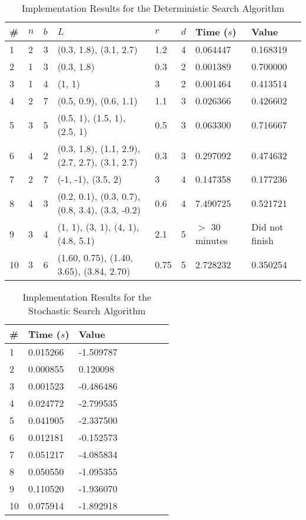 \documentclass[../main.tex]{subfiles}
\begin{document}
\begin{table*}
\caption{Implementation Results for the Deterministic Search Algorithm}
\centering
\label{tab:det-results}
\begin{tabular}{|l|l|l|l|l|l|l|l|}
\hline
\# & $n$ & $b$ & $L$                                             & $r$  & $d$ & Time ($s$)     & Value          \\
\hline
1  & 2   & 3   & (0.3, 1.8), (3.1, 2.7)                          & 1.2  & 4   & 0.064447       & 0.168319       \\
2  & 1   & 3   & (0.3, 1.8)                                      & 0.3  & 2   & 0.001389       & 0.700000       \\
3  & 1   & 4   & (1, 1)                                          & 3    & 2   & 0.001464       & 0.413514       \\
4  & 2   & 7   & (0.5, 0.9), (0.6, 1.1)                          & 1.1  & 3   & 0.026366       & 0.426602       \\
5  & 3   & 5   & (0.5, 1), (1.5, 1), (2.5, 1)                    & 0.5  & 3   & 0.063300       & 0.716667       \\
6  & 4   & 2   & (0.3, 1.8), (1.1, 2.9), (2.7, 2.7), (3.1, 2.7)  & 0.3  & 3   & 0.297092       & 0.474632       \\
7  & 2   & 7   & (-1, -1), (3.5, 2)                              & 3    & 4   & 0.147358       & 0.177236       \\
8  & 4   & 3   & (0.2, 0.1), (0.3, 0.7), (0.8, 3.4), (3.3, -0.2) & 0.6  & 4   & 7.490725       & 0.521721       \\
9  & 3   & 4   & (1, 1), (3, 1), (4, 1), (4.8, 5.1)              & 2.1  & 5   & $>$ 30 minutes & Did not finish \\
10 & 3   & 6   & (1.60, 0.75), (1.40, 3.65), (3.84, 2.70)        & 0.75 & 5   & 2.728232       & 0.350254       \\
\hline
\end{tabular}
\end{table*}

\begin{table*}
\caption{Implementation Results for the Stochastic Search Algorithm}
\centering
\label{tab:sto-results}
\begin{tabular}{|l|l|l|l|l|l|l|l|}
\hline
\# & Time ($s$) & Value     \\
\hline
1  & 0.015266   & -1.509787 \\
2  & 0.000855   & 0.120098  \\
3  & 0.001523   & -0.486486 \\
4  & 0.024772   & -2.799535 \\
5  & 0.041905   & -2.337500 \\
6  & 0.012181   & -0.152573 \\
7  & 0.051217   & -4.085834 \\
8  & 0.050550   & -1.095355 \\
9  & 0.110520   & -1.936070 \\
10 & 0.075914   & -1.892918 \\
\hline
\end{tabular}
\end{table*}
\end{document}
